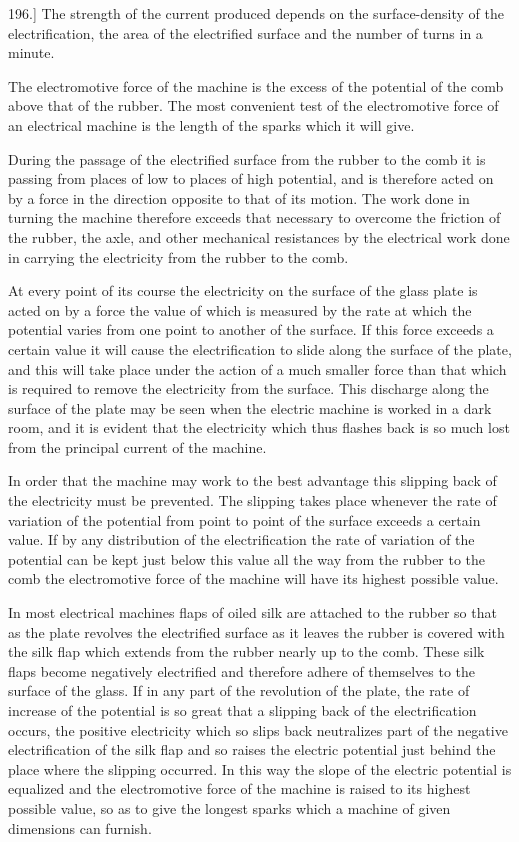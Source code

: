 \documentclass[12pt,oneside]{book}[2021/10/04]
\newcommand{\Runhead}[1]{\fancyhead[C]{\iffloatpage{}{\small#1}}}
\newcommand{\article}[1]{\phantomsection \label{art:#1}{#1.]}}
\newcommand{\¬}{\hphantom{0}}
\begin{document}
\article{196} The strength of the current produced depends on the
surface-density of the electrification, the area of the electrified
surface and the number of turns in a minute.

The electromotive force of the machine is the excess of the
potential of the comb above that of the rubber. The most convenient
test of the electromotive force of an electrical machine is
the length of the sparks which it will give.

During the passage of the electrified surface from the rubber to
the comb it is passing from places of low to places of high potential,
and is therefore acted on by a force in the direction opposite to
that of its motion. The work done in turning the machine therefore
exceeds that necessary to overcome the friction of the rubber,
the axle, and other mechanical resistances by the electrical work
done in carrying the electricity from the rubber to the comb.

At every point of its course the electricity on the surface of the
glass plate is acted on by a force the value of which is measured
by the rate at which the potential varies from one point to another
of the surface. If this force exceeds a certain value it will cause
the electrification to slide along the surface of the plate, and this
will take place under the action of a much smaller force than that
which is required to remove the electricity from the surface. This
discharge along the surface of the plate may be seen when the
electric machine is worked in a dark room, and it is evident that
the electricity which thus flashes back is so much lost from the
principal current of the machine.

In order that the machine may work to the best advantage
this slipping back of the electricity must be prevented. The
slipping takes place whenever the rate of variation of the potential
from point to point of the surface exceeds a certain value. If by
any distribution of the electrification the rate of variation of the
potential can be kept just below this value all the way from the
rubber to the comb the electromotive force of the machine will have
its highest possible value.

In most electrical machines flaps of oiled silk are attached to
the rubber so that as the plate revolves the electrified surface as
it leaves the rubber is covered with the silk flap which extends
from the rubber nearly up to the comb. These silk flaps become
negatively electrified and therefore adhere of themselves to the
surface of the glass. If in any part of the revolution of the plate,
the rate of increase of the potential is so great that a slipping
back of the electrification occurs, the positive electricity which so
slips back neutralizes part of the negative electrification of the
silk flap and so raises the electric potential just behind the place
where the slipping occurred. In this way the slope of the electric
potential is equalized and the electromotive force of the machine is
raised to its highest possible value, so as to give the longest sparks
which a machine of given dimensions can furnish.
\Runhead{ACTION OF SILK FLAPS.}
\end{document}
